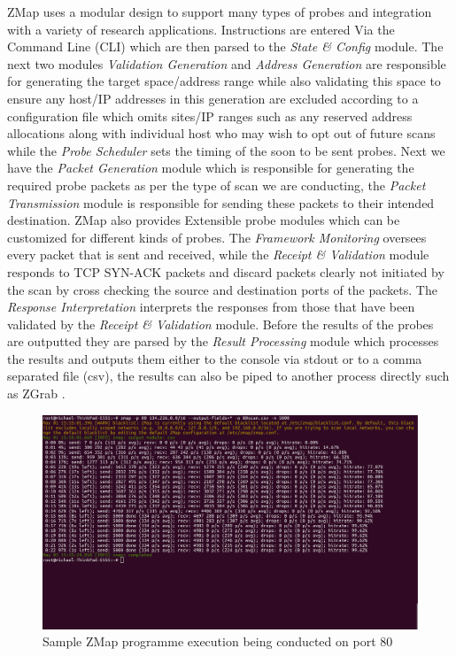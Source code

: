 \documentclass[a4wide,leqno,12pt]{report}
\begin{document}
ZMap uses a modular design to support many types of probes and integration with a variety of research applications. Instructions are entered Via the Command Line (CLI) which are then parsed to the \textit{State \& Config} module. The next two modules \textit{Validation Generation} and
\textit{Address Generation} are responsible for generating the target space/address range while also validating this space to ensure any host/IP addresses in this generation are excluded according to a configuration file which omits sites/IP ranges such as any reserved address allocations along with individual host who may wish to opt out of future scans \cite{durumeric2013zmap} while the \textit{Probe Scheduler} sets the timing of the soon to be sent probes. Next we have the \textit{Packet Generation} module which is responsible for generating the required probe packets as per the type of scan we are conducting, the \textit{Packet Transmission} module is responsible for sending these packets to their intended destination. ZMap also provides Extensible probe modules which can be customized for different kinds of probes. The \textit{Framework Monitoring} oversees every packet that is sent and received, while the \textit{Receipt \& Validation} module responds to TCP SYN-ACK packets and discard packets clearly not initiated by the scan by cross checking the source and destination ports of the packets. The \textit{Response Interpretation} interprets the responses from those that have been validated by the \textit{Receipt \& Validation} module. Before the results of the probes are outputted they are parsed by the \textit{Result Processing} module which processes the results and outputs them either to the console via stdout or to a comma separated file (csv), the results can also be piped to another process directly such as ZGrab \cite{durumeric2013zmap}.\\


\begin{figure}[H]
\centering
\includegraphics[scale=.3]{pdf_images/zmap_scan_exmaple_2}
\caption{Sample ZMap programme execution being conducted on port 80}
\label{fig:zmap_scan_example}
\end{figure}
\end{document}
